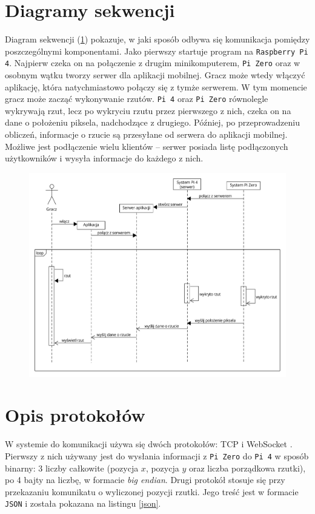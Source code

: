 \section{Diagramy sekwencji}
Diagram sekwencji (\ref{sequence}) pokazuje, w jaki sposób odbywa się komunikacja pomiędzy poszczególnymi komponentami. Jako pierwszy startuje program na \verb|Raspberry Pi 4|. Najpierw czeka on na połączenie z drugim minikomputerem, \verb|Pi Zero| oraz w osobnym wątku tworzy serwer dla aplikacji mobilnej. Gracz może wtedy włączyć aplikację, która natychmiastowo połączy się z tymże serwerem. W tym momencie gracz może zacząć wykonywanie rzutów. \verb|Pi 4| oraz \verb|Pi Zero| równolegle wykrywają rzut, lecz po wykryciu rzutu przez pierwszego z nich, czeka on na dane o położeniu piksela, nadchodzące z drugiego. Później, po przeprowadzeniu obliczeń, informacje o rzucie są przesyłane od serwera do aplikacji mobilnej. Możliwe jest podłączenie wielu klientów -- serwer posiada listę podłączonych użytkowników i wysyła informacje do każdego z nich. 
\begin{figure}[h!]
\begin{center}
\includegraphics[width=\textwidth]{obrazki/sequence.pdf}
\end{center}
\label{sequence}
\end{figure}

\section{Opis protokołów}
W systemie do komunikacji używa się dwóch protokołów: TCP \cite{TCP} i WebSocket \cite{WebSocket}. Pierwszy z nich używany jest do wysłania informacji z \verb|Pi Zero| do \verb|Pi 4| w sposób binarny: 3 liczby całkowite (pozycja $x$, pozycja $y$ oraz liczba porządkowa rzutki), po 4 bajty na liczbę, w formacie \textit{big endian}. Drugi protokół stosuje się przy przekazaniu komunikatu o wyliczonej pozycji rzutki. Jego treść jest w formacie \verb|JSON| i została pokazana na listingu \ref{json}. 

